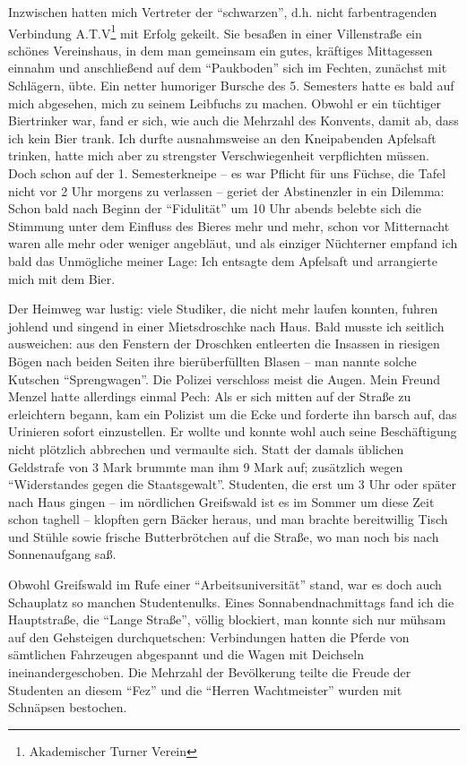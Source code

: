 \documentclass[a5paper,pagesize,10pt,twoside=true]{scrbook}
\begin{document}
Inzwischen hatten mich Vertreter der \enquote{schwarzen}, d.h. nicht farbentragenden Verbindung A.T.V\footnote{Akademischer Turner Verein} mit Erfolg gekeilt. Sie besaßen in einer Villenstraße ein schönes Vereinshaus, in dem man gemeinsam ein gutes, kräftiges Mittagessen einnahm und anschließend auf dem \enquote{Paukboden} sich im Fechten, zunächst mit Schlägern, übte. Ein netter humoriger Bursche des 5. Semesters hatte es bald auf mich abgesehen, mich zu seinem Leibfuchs zu machen. Obwohl er ein tüchtiger Biertrinker war, fand er sich, wie auch die Mehrzahl des Konvents, damit ab, dass ich kein Bier trank. Ich durfte ausnahmsweise an den Kneipabenden Apfelsaft trinken, hatte mich aber zu strengster Verschwiegenheit verpflichten müssen. Doch schon auf der 1. Semesterkneipe -- es war Pflicht für uns Füchse, die Tafel nicht vor 2 Uhr morgens zu verlassen -- geriet der Abstinenzler in ein Dilemma: Schon bald nach Beginn der \enquote{Fidulität} um 10 Uhr abends belebte sich die Stimmung unter dem Einfluss des Bieres mehr und mehr, schon vor Mitternacht waren alle mehr oder weniger angebläut, und als einziger Nüchterner empfand ich bald das Unmögliche meiner Lage: Ich entsagte dem Apfelsaft und arrangierte mich mit dem Bier.

Der Heimweg war lustig: viele Studiker, die nicht mehr laufen konnten, fuhren johlend und singend in einer Mietsdroschke nach Haus. Bald musste ich seitlich ausweichen: aus den Fenstern der Droschken entleerten die Insassen in riesigen Bögen nach beiden Seiten ihre bierüberfüllten Blasen -- man nannte solche Kutschen \enquote{Sprengwagen}. Die Polizei verschloss meist die Augen. Mein Freund Menzel hatte allerdings einmal Pech: Als er sich mitten auf der Straße zu erleichtern begann, kam ein Polizist um die Ecke und forderte ihn barsch auf, das Urinieren sofort einzustellen. Er wollte und konnte wohl auch seine Beschäftigung nicht plötzlich abbrechen und vermaulte sich. Statt der damals üblichen Geldstrafe von 3 Mark brummte man ihm 9 Mark auf; zusätzlich wegen \enquote{Widerstandes gegen die Staatsgewalt}. Studenten, die erst um 3 Uhr oder später nach Haus gingen -- im nördlichen Greifswald ist es im Sommer um diese Zeit schon taghell -- klopften gern Bäcker heraus, und man brachte bereitwillig Tisch und Stühle sowie frische Butterbrötchen auf die Straße, wo man noch bis nach Sonnenaufgang saß.

Obwohl Greifswald im Rufe einer \enquote{Arbeitsuniversität} stand, war es doch auch Schauplatz so manchen Studentenulks. Eines Sonnabendnachmittags fand ich die Hauptstraße, die \enquote{Lange Straße}, völlig blockiert, man konnte sich nur mühsam auf den Gehsteigen durchquetschen: Verbindungen hatten die Pferde von sämtlichen Fahrzeugen abgespannt und die Wagen mit Deichseln ineinandergeschoben. Die Mehrzahl der Bevölkerung teilte die Freude der Studenten an diesem \enquote{Fez} und die \enquote{Herren Wachtmeister} wurden mit Schnäpsen bestochen.
\end{document}
